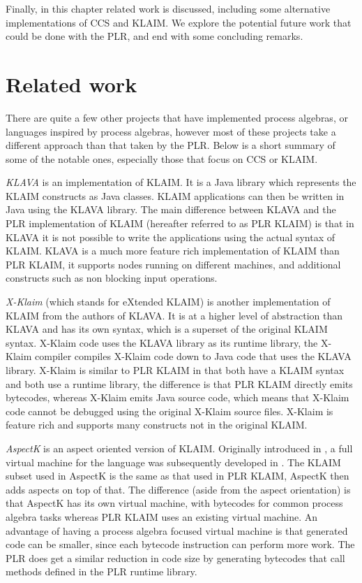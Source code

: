 	Finally, in this chapter related work is discussed, including some 
	alternative implementations of CCS and KLAIM. We explore the potential 
	future work that could be done with the PLR, and end with some concluding 
	remarks.
	
	
\section{Related work}\label{sec:related_work}
	
	There are quite a few other projects that have implemented process algebras, 
	or languages inspired by process algebras, however most of these projects 
	take a different approach than that taken by the PLR. Below is a short 
	summary of some of the notable ones, especially those that focus on CCS or 
	KLAIM.
	
	\textit{KLAVA} \cite{klava} is an implementation of KLAIM. It is a Java 
	library which represents the KLAIM constructs as Java classes. KLAIM 
	applications can then be written in Java using the KLAVA library. The main 
	difference between KLAVA and the PLR implementation of KLAIM (hereafter 
	referred to as PLR KLAIM) is that in KLAVA it is not possible to write the 
	applications using the actual syntax of KLAIM. KLAVA is a much more feature 
	rich implementation of KLAIM than PLR KLAIM, it supports nodes running on 
	different machines, and additional constructs such as non blocking input 
	operations.
	
	\textit{X-Klaim} \cite{xklaim} (which stands for eXtended KLAIM) is another 
	implementation of KLAIM from the authors of KLAVA. It is at a higher level 
	of abstraction than KLAVA and has its own syntax, which is a superset of
	the original KLAIM syntax. X-Klaim code uses the KLAVA library as its 
	runtime library, the X-Klaim compiler compiles X-Klaim code down to Java 
	code that uses the KLAVA library. X-Klaim is similar to PLR KLAIM in that 
	both have a KLAIM syntax and both use a runtime library, the difference is 
	that PLR KLAIM directly emits bytecodes, whereas X-Klaim emits Java source 
	code, which means that X-Klaim code cannot be debugged using the original
	X-Klaim source files. X-Klaim is feature rich and supports many constructs
	not in the original KLAIM.
	
	\textit{AspectK} is an aspect oriented version of KLAIM. Originally 
	introduced in \cite{aspectk}, a full virtual machine for the language was 
	subsequently developed in \cite{giordano}. The KLAIM subset used in AspectK 
	is the same as that used in PLR KLAIM, AspectK then adds aspects on top of 
	that. The difference (aside from the aspect orientation) is that AspectK has 
	its own virtual machine, with bytecodes for common process algebra tasks 
	whereas PLR KLAIM uses an existing virtual machine. An advantage of having a 
	process algebra focused virtual machine is that generated code can be 
	smaller, since each bytecode instruction can perform more work. The PLR does 
	get a similar reduction in code size by generating bytecodes that call 
	methods defined in the PLR runtime library.
	
